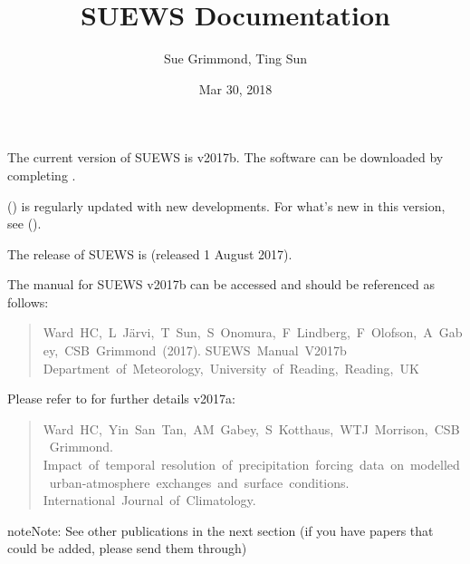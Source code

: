 \documentclass[letterpaper,10pt,english]{sphinxmanual}
\title{SUEWS Documentation}
\date{Mar 30, 2018}
\author{Sue Grimmond, Ting Sun}
\begin{document}
\maketitle
\sphinxtableofcontents
{}\label{\detokenize{index::doc}}


The current version of SUEWS is v2017b. The software can be downloaded
by completing .

{\hyperref[\detokenize{index:index-page}]{}} () is regularly
updated with new developments. For what’s new in this version, see {\hyperref[\detokenize{version-history:new-latest}]{}} ().

The  release of SUEWS is  (released 1 August
2017).

The manual for SUEWS v2017b can be accessed
 and should be referenced as
follows:
\begin{quote}

Ward HC, L Järvi, T Sun, S Onomura, F Lindberg, F Olofson, A Gabey, CSB Grimmond (2017).
SUEWS Manual V2017b Department of Meteorology, University of Reading, Reading, UK
\end{quote}

Please refer to  for
further details v2017a:
\begin{quote}

Ward HC, Yin San Tan, AM Gabey, S Kotthaus, WTJ Morrison, CSB Grimmond.
Impact of temporal resolution of precipitation forcing data on modelled urban-atmosphere exchanges and surface conditions.
International Journal of Climatology.
\end{quote}

\begin{sphinxadmonition}{note}{Note:}
See other publications in the next section (if you have papers that could be added, please send them through)
\end{sphinxadmonition}
\end{document}
